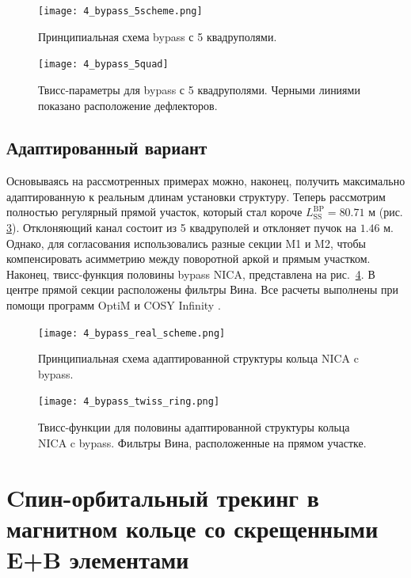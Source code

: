 \begin{figure}[!h]
  \centering
   \texttt{[image: 4\_bypass\_5scheme.png]}
   \caption{Принципиальная схема bypass с 5 квадруполями.}
   \label{fig:4_bypass_5scheme}
\end{figure}

\begin{figure}[!h]
  \centering
   \texttt{[image: 4\_bypass\_5quad]}
   \caption{Твисс-параметры для bypass с 5 квадруполями. Черными линиями показано расположение дефлекторов.}
   \label{fig:4_bypass_5quad}
\end{figure}

	\subsection{Адаптированный вариант}\label{sec:EDM/Wien_filter/ByPass/final}

\par Основываясь на рассмотренных примерах можно, наконец, получить максимально адаптированную к реальным длинам установки структуру. Теперь рассмотрим полностью регулярный прямой участок, который стал короче $L_{\textrm{SS}}^{\textrm{BP}}=80.71$ м (рис. \ref{fig:4_bypass_real_scheme}). Отклоняющий канал состоит из 5 квадруполей и отклоняет пучок на $1.46$ м. Однако, для согласования использовались разные секции M1 и M2, чтобы компенсировать асимметрию между поворотной аркой и прямым участком. Наконец, твисс-функция половины bypass NICA, представлена на рис.~\ref{fig:4_bypass_twiss_ring}. В центре прямой секции расположены фильтры Вина. Все расчеты выполнены при помощи программ OptiM \cite{optim} и COSY Infinity \cite{cosy}.

\begin{figure}[!h]
  \centering
   \texttt{[image: 4\_bypass\_real\_scheme.png]}
   \caption{Принципиальная схема адаптированной структуры кольца NICA c bypass.}
   \label{fig:4_bypass_real_scheme}
\end{figure}

\begin{figure}[!h]
  \centering
   \texttt{[image: 4\_bypass\_twiss\_ring.png]}
   \caption{Твисс-функции для половины адаптированной структуры кольца NICA c bypass. Фильтры Вина, расположенные на прямом участке.}
   \label{fig:4_bypass_twiss_ring}
\end{figure}

\newpage
	
	\section{Cпин-орбитальный трекинг в магнитном кольце со скрещенными E+B элементами} \label{sec:EDM/Wien_filter_tracking}

